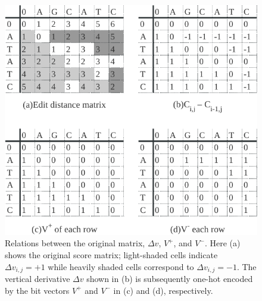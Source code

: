 \begin{figure}[!htb]
  \includegraphics[width=1\linewidth]{figures/BitDP}
  \caption{Relations between the original matrix, $\varDelta v$,
    $V^+$, and $V^-$.  Here (a) shows the original score matrix;
    light-shaded cells indicate $\varDelta v_{i,j}=+1$ while heavily
    shaded cells correspond to $\varDelta v_{i,j}=-1$. The vertical
    derivative $\varDelta v$ shown in (b) is subsequently one-hot
    encoded by the bit vectors $V^+$ and $V^-$ in (c) and (d),
    respectively.}
  \label{BitDP}
\end{figure}
